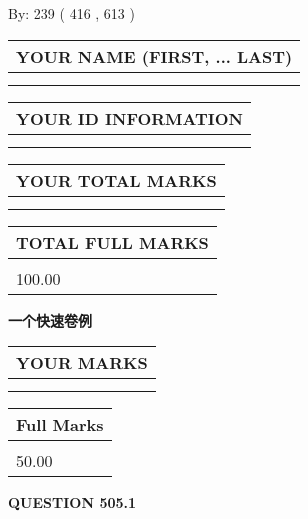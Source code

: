 \documentclass{ctexart}
\begin{document}
   
\hspace{1.0in} By: 
 239 ( 416 ,  613 )
   
   
   
   
\newpage 
\setcounter{page}{ 
   505001 } 
   
   
   
   
\noindent\begin{tabular}{|l|}
\hline
YOUR NAME (FIRST, ... LAST)  \\
\hline
 \\ 
 \\ 
\hline
\end{tabular}
\hspace{0.05in} \begin{tabular}{|l|}
\hline
 YOUR   ID   INFORMATION  \\
\hline
 \\ 
 \\ 
\hline
\end{tabular}
   
   
\vspace{0.2in}\noindent\begin{tabular}{|l|}
\hline
YOUR TOTAL MARKS  \\
\hline
 \\ 
 \\ 
\hline
\end{tabular}
\hspace{0.05in} \begin{tabular}{|l|}
\hline
TOTAL FULL MARKS  \\
\hline
 \\ 
100.00 \\
\hline
\end{tabular}
   
   
 \vspace{0.2in}
{\LARGE {\textbf{ 一个快速卷例}}}
   
   
  
\vspace{0.2in}
  
\noindent\begin{tabular}{|l|}
\hline
 YOUR MARKS  \\
\hline
 \\ 
 \\ 
\hline
\end{tabular}
\hspace{0.05in} \begin{tabular}{|l|}
\hline
 Full Marks  \\
\hline
 \\ 
50.00 \\
\hline
\end{tabular}
{\textbf{\Large{QUESTION
505.1 
}}}
  
\end{document}
